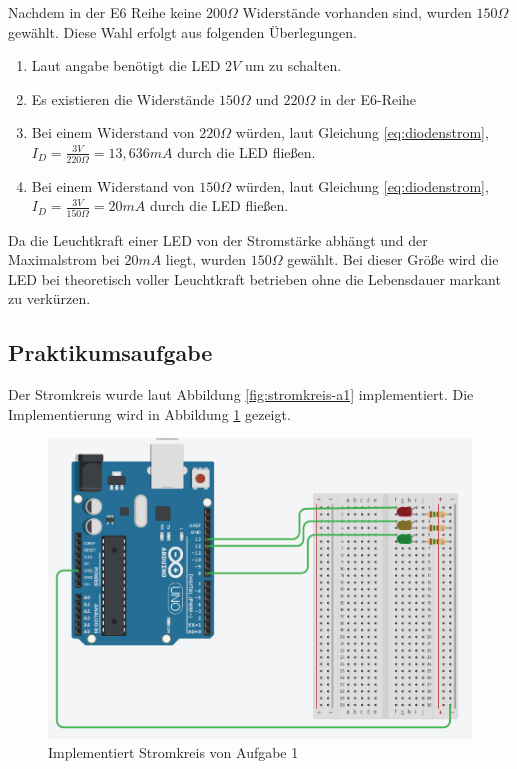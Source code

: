 Nachdem in der E6 Reihe keine $200\Omega$ Widerstände vorhanden sind, wurden $150\Omega$ gewählt.
Diese Wahl erfolgt aus folgenden Überlegungen.

\begin{enumerate}
    \item Laut angabe benötigt die LED $2V$ um zu schalten.
    \item Es existieren die Widerstände $150\Omega$ und $220\Omega$ in der E6-Reihe
    \item Bei einem Widerstand von $220\Omega$ würden, laut Gleichung \ref{eq:diodenstrom}, $I_D = \frac{3V}{220\Omega} = 13,636mA$ durch die LED fließen.
    \item Bei einem Widerstand von $150\Omega$ würden, laut Gleichung \ref{eq:diodenstrom}, $I_D = \frac{3V}{150\Omega} = 20mA$ durch die LED fließen.
\end{enumerate}
Da die Leuchtkraft einer LED von der Stromstärke abhängt und der Maximalstrom bei $20mA$ liegt, wurden $150\Omega$ gewählt.
Bei dieser Größe wird die LED bei theoretisch voller Leuchtkraft betrieben ohne die Lebensdauer markant zu verkürzen.

\subsection{Praktikumsaufgabe}
\label{subsec:praktikumsaufgabe}

Der Stromkreis wurde laut Abbildung \ref{fig:stromkreis-a1} implementiert.
Die Implementierung wird in Abbildung \ref{fig:implementierung-a1} gezeigt.

\begin{figure}[h]
    \centering
    \includegraphics[width=\textwidth]{pictures/a1-praktik.png}
    \caption{Implementiert Stromkreis von Aufgabe 1}
    \label{fig:implementierung-a1}
\end{figure}

